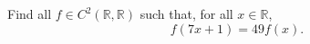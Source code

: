 \begin{problem}
    Find all \( f \in C^2\left(\mathbb{R},\mathbb{R}\right) \) such that, for all \( x \in \mathbb{R} \),
    \[
        f\left(7x+1\right) = 49f\left(x\right).
    \]
\end{problem}
